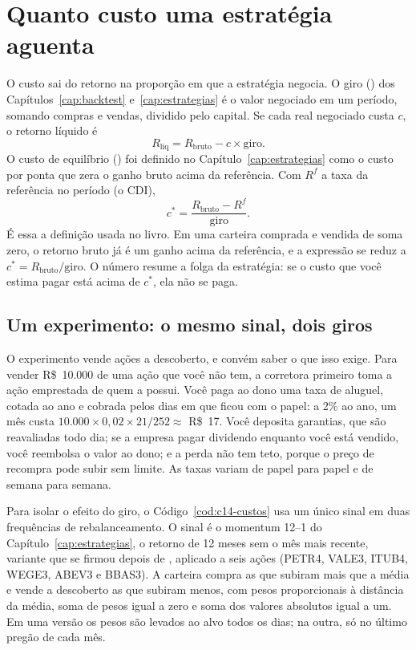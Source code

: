 \section{Quanto custo uma estratégia aguenta}

O custo sai do retorno na proporção em que a estratégia negocia. O giro () dos Capítulos~\ref{cap:backtest} e~\ref{cap:estrategias} é o valor negociado em um período, somando compras e vendas, dividido pelo capital. Se cada real negociado custa $c$, o retorno líquido é
\begin{equation}
  R_{\text{líq}} = R_{\text{bruto}} - c \times \text{giro} .
  \label{eq:c14-liquido}
\end{equation}
O custo de equilíbrio () foi definido no Capítulo~\ref{cap:estrategias} como o custo por ponta que zera o ganho bruto acima da referência. Com $R^{f}$ a taxa da referência no período (o CDI),
\begin{equation}
  c^{*} = \frac{R_{\text{bruto}} - R^{f}}{\text{giro}} .
  \label{eq:c14-equilibrio}
\end{equation}
É essa a definição usada no livro. Em uma carteira comprada e vendida de soma zero, o retorno bruto já é um ganho acima da referência, e a expressão se reduz a $c^{*} = R_{\text{bruto}} / \text{giro}$. O número resume a folga da estratégia: se o custo que você estima pagar está acima de $c^{*}$, ela não se paga.

\subsection{Um experimento: o mesmo sinal, dois giros}

O experimento vende ações a descoberto, e convém saber o que isso exige. Para vender R\$~10.000 de uma ação que você não tem, a corretora primeiro toma a ação emprestada de quem a possui. Você paga ao dono uma taxa de aluguel, cotada ao ano e cobrada pelos dias em que ficou com o papel: a 2\% ao ano, um mês custa $10.000 \times 0,02 \times 21/252 \approx$ R\$~17. Você deposita garantias, que são reavaliadas todo dia; se a empresa pagar dividendo enquanto você está vendido, você reembolsa o valor ao dono; e a perda não tem teto, porque o preço de recompra pode subir sem limite. As taxas variam de papel para papel e de semana para semana.

Para isolar o efeito do giro, o Código~\ref{cod:c14-custos} usa um único sinal em duas frequências de rebalanceamento. O sinal é o momentum 12--1 do Capítulo~\ref{cap:estrategias}, o retorno de 12 meses sem o mês mais recente, variante que se firmou depois de \citet{jegadeesh1993}, aplicado a seis ações (PETR4, VALE3, ITUB4, WEGE3, ABEV3 e BBAS3). A carteira compra as que subiram mais que a média e vende a descoberto as que subiram menos, com pesos proporcionais à distância da média, soma de pesos igual a zero e soma dos valores absolutos igual a um. Em uma versão os pesos são levados ao alvo todos os dias; na outra, só no último pregão de cada mês.

